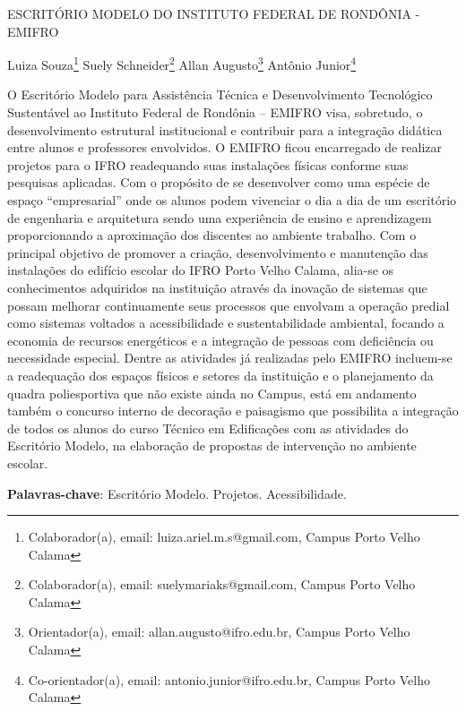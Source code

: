 \documentclass[article,12pt,onesidea,4paper,english,brazil]{abntex2}
\begin{document}
	
	
	\frenchspacing 
	
	\begin{center}
		\LARGE ESCRITÓRIO MODELO DO INSTITUTO FEDERAL DE RONDÔNIA - EMIFRO
		
		\normalsize
		Luiza Souza\footnote{Colaborador(a), email: luiza.ariel.m.s@gmail.com, Campus Porto Velho Calama} 
		Suely Schneider\footnote{Colaborador(a), email: suelymariaks@gmail.com, Campus Porto Velho Calama} 
		Allan Augusto\footnote{Orientador(a), email: allan.augusto@ifro.edu.br, Campus Porto Velho Calama} 
		Antônio Junior\footnote{Co-orientador(a), email: antonio.junior@ifro.edu.br, Campus Porto Velho Calama} 
	\end{center}
	
	\noindent O Escritório Modelo para Assistência Técnica e Desenvolvimento Tecnológico Sustentável ao Instituto Federal de Rondônia – EMIFRO visa, sobretudo, o desenvolvimento estrutural institucional e contribuir para a integração didática entre alunos e professores envolvidos. O EMIFRO ficou encarregado de realizar projetos para o IFRO readequando suas instalações físicas conforme suas pesquisas aplicadas. Com o propósito de se desenvolver como uma espécie de espaço “empresarial” onde os alunos podem vivenciar o dia a dia de um escritório de engenharia e arquitetura sendo uma experiência de ensino e aprendizagem proporcionando a aproximação dos discentes ao ambiente trabalho. Com o principal objetivo de promover a criação, desenvolvimento e manutenção das instalações do edifício escolar do IFRO Porto Velho Calama, alia-se os conhecimentos adquiridos na instituição através da inovação de sistemas que possam melhorar continuamente seus processos que envolvam a operação predial como sistemas voltados a acessibilidade e sustentabilidade ambiental, focando a economia de recursos energéticos e a integração de pessoas com deficiência ou necessidade especial. Dentre as atividades já realizadas pelo EMIFRO incluem-se a readequação dos espaços físicos e setores da instituição e o planejamento da quadra poliesportiva que não existe ainda no Campus, está em andamento também o concurso interno de decoração e paisagismo que possibilita a integração de todos os alunos do curso Técnico em Edificações com as atividades do Escritório Modelo, na elaboração de propostas de intervenção no ambiente escolar.
	
	\vspace{\onelineskip}
	
	\noindent
	\textbf{Palavras-chave}: Escritório Modelo. Projetos. Acessibilidade.
	
\end{document}
